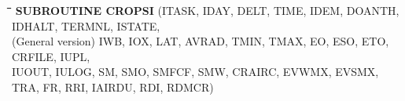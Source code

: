 \nwln
\begin{tabbing}
\hspace{1.27cm}\=\hspace{1.27cm}\=\hspace{1.27cm}\=\hspace{1.27cm}\=%
\hspace{1.27cm}\=\hspace{1.27cm}\=\hspace{1.27cm}\=\hspace{1.27cm}\=%
\hspace{1.27cm}\=\hspace{1.27cm}\=\kill
{\bf SUBROUTINE CROPSI}\> \> \> (ITASK, IDAY, DELT, TIME, IDEM, DOANTH, IDHALT, TERMNL, ISTATE,\\
(General version)\> \> \>  IWB, IOX, LAT, AVRAD, TMIN, TMAX, EO, ESO, ETO, CRFILE, IUPL,\\
\>\> \>  IUOUT, IULOG, SM, SMO, SMFCF, SMW, CRAIRC, EVWMX, EVSMX,\\
 \>\> \>  TRA, FR, RRI, IAIRDU, RDI, RDMCR)
\end{tabbing}
\nwln
